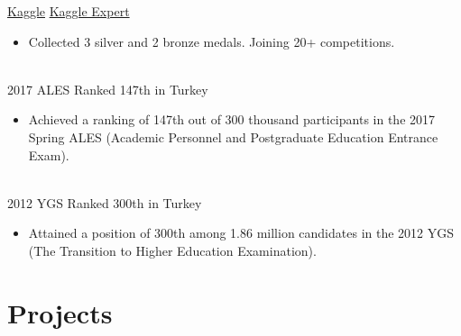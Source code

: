 \documentclass[letterpaper]{DS_class_file} %
\begin{document}
	\begin{twenty} %
		\twentyitem
		{\href{https://www.kaggle.com}{Kaggle}}
		{}
		{\hspace{0.3cm}\href{https://www.kaggle.com/mbkinaci}{Kaggle Expert}}
		{}
		{}
		{
			{\begin{itemize}
					\item Collected 3 silver and 2 bronze medals. Joining 20+ competitions.
			\end{itemize}}
		}
		\\
		\twentyitem
		{2017 ALES}
		{}
		{\hspace{0.3cm}Ranked 147th in Turkey}
		{}
		{}
		{
			{\begin{itemize}
					\item Achieved a ranking of 147th out of 300 thousand participants in the 2017 Spring ALES (Academic Personnel and Postgraduate \newline Education Entrance Exam).
			\end{itemize}}
		}
		\\
		\twentyitem
		{2012 YGS}
		{}
		{\hspace{0.3cm}Ranked 300th in Turkey}
		{}
		{}
		{\begin{itemize}
				\item Attained a position of 300th among 1.86 million candidates in the 2012 YGS (The Transition to Higher Education Examination).    
	   
		\end{itemize}}
	
	\end{twenty}
	
	\newpage
	
	\makeseconda %
	
	\section{Projects}
	
\end{document}
